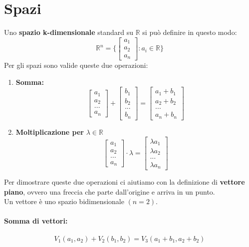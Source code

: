 \documentclass[12pt,a4paper]{article}
\let\oldsection\section
\renewcommand{\section}{\clearpage\oldsection}
\begin{document}
\section{Spazi}
Uno \textbf{spazio k-dimensionale} standard su $\mathbb{R}$ si può definire in questo modo:
\[
\mathbb{R}^n = \{\begin{bmatrix}
    a_1\\
    a_2\\
    a_n
\end{bmatrix}: a_i \in \mathbb{R}\}
\]
Per gli spazi sono valide queste due operazioni:
\begin{enumerate}
  \item \textbf{Somma:}
  \[
  \begin{bmatrix}
    a_1\\
    a_2\\
    ...\\
    a_n
  \end{bmatrix}
   + \begin{bmatrix}
    b_1\\
    b_2\\
    ...\\
    b_n
   \end{bmatrix}
   = \begin{bmatrix}
    a_1 + b_1 \\
    a_2 + b_2 \\
    ...\\
    a_n + b_n
   \end{bmatrix}
  \]
  \item \textbf{Moltiplicazione per} $\lambda \in \mathbb{R}$
  \[
  \begin{bmatrix}
    a_1\\
    a_2\\
    ...\\
    a_n
  \end{bmatrix}
  \cdot \lambda = 
  \begin{bmatrix}
    \lambda a_1\\
    \lambda a_2\\
    ...\\
    \lambda a_n
  \end{bmatrix}
  \]
\end{enumerate}
Per dimostrare queste due operazioni ci aiutiamo con la definizione di \textbf{vettore piano}, ovvero una freccia che parte dall'origine e arriva in un punto.\\
Un vettore è uno spazio bidimensionale $(n = 2)$.
\paragraph{Somma di vettori:}
\[
V_1(a_1, a_2) + V_2(b_1, b_2) = V_3(a_1 + b_1, a_2 + b_2)
\]
\end{document}
